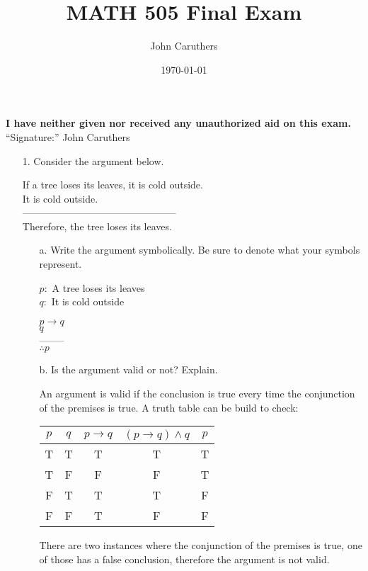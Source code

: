 \documentclass{article}
\title{MATH 505 Final Exam}
\author{John Caruthers}
\date\today
\begin{document}
\maketitle

\textbf{I have neither given nor received any unauthorized aid on this exam.} \\\hspace*{1cm}“Signature:” John Caruthers

\begin{itemize}
    \item[1.] Consider the argument below.
    
    If a tree loses its leaves, it is cold outside.\\
    It is cold outside.\\
    ----------------------------------------------- \\
    Therefore, the tree loses its leaves.
    \begin{itemize}
        \item[a.] Write the argument symbolically.  Be sure to denote what your symbols represent.\\
        {\color{blue}
        $p:$ A tree loses its leaves\\
        $q:$ It is cold outside
        
        \hspace*{1cm}$p\to q$\\
        \hspace*{1cm}$q$\\
        \hspace*{1cm}-------- \\
        \hspace*{1cm}$\therefore p$}
        
        \item[b.] Is the argument valid or not? Explain.
        
        An argument is valid if the conclusion is true every time the conjunction of the premises is true.  A truth table can be build to check:
        \begin{center}
            \begin{tabular}{|c|c|c|c|c|}
                \hline
                $p$ & $q$ & $p\to q$ & $(p\to q)\wedge q$ & $p$ \\
                \hline
                \rowcolor{LightCyan}
                T & T & T & T & T\\
                \hline
                T & F & F & F & T\\
                \hline
                \rowcolor{LightRed}
                F & T & T & T & F\\
                \hline
                F & F & T & F & F\\
                \hline
            \end{tabular}
        \end{center}
        {\color{blue}There are two instances where the conjunction of the premises is true, one of those has a false conclusion, therefore the argument is not valid.}
    \end{itemize}
    

\end{itemize}
\end{document}
